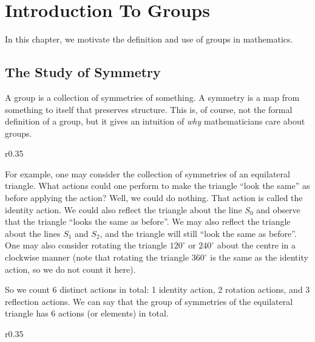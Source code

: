 \chapter{Introduction To Groups}
In this chapter, we motivate the definition and use of groups in mathematics.

\section{The Study of Symmetry}
A group is a collection of symmetries of something. A symmetry is a map from something to itself that preserves structure. This is, of course, not the formal definition of a group, but it gives an intuition of \textit{why} mathematicians care about groups.

\begin{wrapfigure}{r}{0.35\textwidth}
    \centering
\end{wrapfigure}

For example, one may consider the collection of symmetries of an equilateral triangle. What actions could one perform to make the triangle ``look the same'' as before applying the action? Well, we could do nothing. That action is called the identity action. We could also reflect the triangle about the line $S_0$ and observe that the triangle ``looks the same as before''. We may also reflect the triangle about the lines $S_1$ and $S_2$, and the triangle will still ``look the same as before''. One may also consider rotating the triangle $120^\circ$ or $240^\circ$ about the centre in a clockwise manner (note that rotating the triangle $360^\circ$ is the same as the identity action, so we do not count it here).

So we count 6 distinct actions in total: 1 identity action, 2 rotation actions, and 3 reflection actions. We can say that the group of symmetries of the equilateral triangle has 6 actions (or elements) in total.

\begin{wrapfigure}{r}{0.35\textwidth}
    \centering
\end{wrapfigure}

